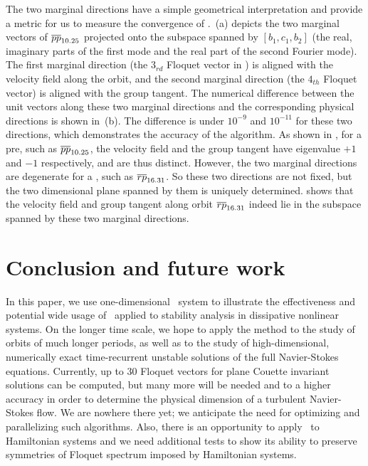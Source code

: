 \documentclass[final,leqno,onefignum,onetabnum]{siamltexmm}
\begin{document}
The two marginal directions have a simple geometrical interpretation and provide
a metric for us to measure the convergence of \ped.
\,(a) depicts the two marginal vectors of
${\overline{pp}}_{10.25}$ projected onto the subspace spanned
by {$[b_1, c_{1}, b_{2}]$}
(the real, imaginary parts of the first mode and the real part of the
second Fourier mode). The first marginal {direction} (the $3_{rd}$
Floquet vector in  ) is aligned with the velocity
field along the orbit, and the second marginal direction (the $4_{th}$
Floquet vector) is aligned with the group tangent. The numerical
difference between the unit vectors along these two marginal directions
and the corresponding physical directions is shown in
\,(b). The difference is under $10^{-9}$ and
$10^{-11}$ for these two directions, which demonstrates the accuracy of
the algorithm.
As shown in , for a pre\po, such as ${\overline{pp}}_{10.25}$,
the {velocity field} and the group tangent have eigenvalue $+1$ and
$-1$ respectively, and are thus distinct. However, the two marginal
directions are degenerate for a \rpo, such as ${\overline{rp}}_{16.31}$. So these two
directions are not fixed, but the
{two dimensional plane spanned by them is uniquely
determined.  shows that} the velocity field and
group tangent along orbit ${\overline{rp}}_{16.31}$ indeed lie in the subspace spanned
by these two marginal directions.


\section{Conclusion and future work}
\label{sect:concl}

{In this paper},
we use one-dimensional \KS\ system to illustrate the effectiveness
and potential wide usage of \ped\ applied to stability analysis
in dissipative nonlinear systems.
On the longer time scale, we hope to apply the method to
the study of orbits of much longer
periods, as well as to the study of high-dimensional, numerically exact
time-recurrent unstable solutions of the full Navier-Stokes equations.
Currently, up to 30 Floquet vectors for plane Couette invariant
solutions can be computed, but many more will be needed
and to a
higher accuracy in order to determine the physical dimension of a turbulent
Navier-Stokes flow. We are nowhere there yet; we anticipate the need for
optimizing and parallelizing such algorithms. Also, there is an opportunity
to apply \ped\ to Hamiltonian systems and we need additional tests to
show its ability to preserve symmetries of Floquet spectrum imposed by
Hamiltonian systems.
\end{document}
